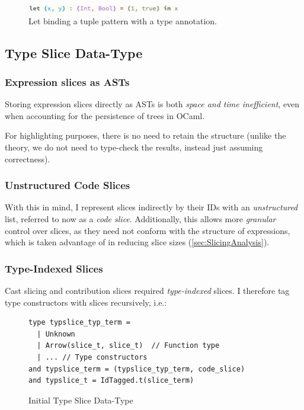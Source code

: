 \begin{figure}[h]
\center\includegraphics[width=0.6\textwidth]{Media/Figures/tuple_term_structure}
\caption{Let binding a tuple pattern with a type annotation.}
\label{fig:tupletermstructure}
\end{figure}
 
\subsection{Type Slice Data-Type}\label{sec:TypeSliceDataType}

\subsubsection{Expression slices as ASTs}

Storing expression slices directly as ASTs is both \textit{space and time inefficient}, even when accounting for the persistence \cite[ch. 2]{PurelyFunctionalDataStructures} of trees in OCaml. 

For highlighting purposes, there is no need to retain the structure (unlike the theory, we do not need to type-check the results, instead just assuming correctness). 

\subsubsection{Unstructured Code Slices}
\label{sec:UnstructuredSlices}
With this in mind, I represent slices indirectly by their IDs with an \textit{unstructured} list, referred to now as a \textit{code slice}. Additionally, this allows more \textit{granular} control over slices, as they need not conform with the structure of expressions, which is taken advantage of in reducing slice sizes (\cref{sec:SlicingAnalysis}).

\subsubsection{Type-Indexed Slices}
Cast slicing and contribution slices required \textit{type-indexed} slices. I therefore tag type constructors with slices recursively, i.e.:

\begin{figure}[h]
\begin{verbatim}
type typslice_typ_term = 
  | Unknown
  | Arrow(slice_t, slice_t)  // Function type
  | ... // Type constructors
and typslice_term = (typslice_typ_term, code_slice)
and typslice_t = IdTagged.t(slice_term)
\end{verbatim}
\caption{Initial Type Slice Data-Type}
\end{figure}

